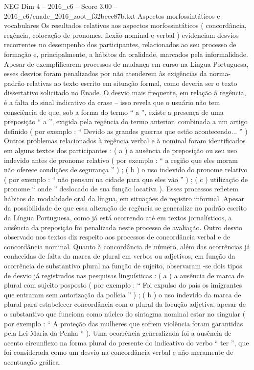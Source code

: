\begin{textsample}{NEG Dim 4 – 2016\_c6 – Score 3.00 – 2016\_c6/enade\_2016\_zoot\_f32beec87b.txt}
Aspectos morfossintáticos e vocabulares Os resultados relativos aos aspectos morfossintáticos ( concordância, regência, colocação de pronomes, flexão nominal e verbal ) evidenciam desvios recorrentes no desempenho dos participantes, relacionados ao seu processo de formação e, principalmente, a hábitos da oralidade, marcados pela informalidade.
Apesar de exemplificarem processos de mudança em curso na Língua Portuguesa, esses desvios foram penalizados por não atenderem às exigências da norma-padrão relativas ao texto escrito em situação formal, como deveria ser o texto dissertativo solicitado no Enade.
O desvio mais frequente, em relação à regência, é a falta do sinal indicativo da crase – isso revela que o usuário não tem consciência de que, sob a forma do termo “ a ”, existe a presença de uma preposição “ a ”, exigida pela regência do termo anterior, combinada a um artigo definido ( por exemplo : “ Devido as grandes guerras que estão acontecendo... ” ) Outros problemas relacionados à regência verbal e à nominal foram identificados em alguns textos dos participantes : ( a ) a ausência de preposição ou seu uso indevido antes de pronome relativo ( por exemplo : “ a região que eles moram não oferece condições de segurança ” ) ; ( b ) o uso indevido do pronome relativo ( por exemplo : “ não pensam na cidade para que eles vão ” ) ; ( c ) utilização de pronome “ onde ” deslocado de sua função locativa ).
Esses processos refletem hábitos da modalidade oral da língua, em situações de registro informal.
Apesar da possibilidade de que essa alteração de regência se generalize no padrão escrito da Língua Portuguesa, como já está ocorrendo até em textos jornalísticos, a ausência da preposição foi penalizada neste processo de avaliação.
Outro desvio observado nos textos diz respeito aos processos de concordância verbal e de concordância nominal.
Quanto à concordância de número, além das ocorrências já conhecidas de falta da marca de plural em verbos ou adjetivos, em função da ocorrência de substantivo plural na função de sujeito, observaram -se dois tipos de desvio já registrados nas pesquisas linguísticas : ( a ) a ausência de marca de plural com sujeito posposto ( por exemplo : “ Foi expulso do país os imigrantes que entraram sem autorização da polícia ” ) ; ( b ) o uso indevido da marca de plural para estabelecer concordância com o plural da locução adjetiva, apesar de o substantivo que funciona como núcleo do sintagma nominal estar no singular ( por exemplo : “ A proteção das mulheres que sofrem violência foram garantidas pela Lei Maria da Penha ” ).
Uma ocorrência generalizada foi a ausência de acento circunflexo na forma plural do presente do indicativo do verbo “ ter ”, que foi considerada como um desvio na concordância verbal e não meramente de acentuação gráfica.

\end{textsample}
